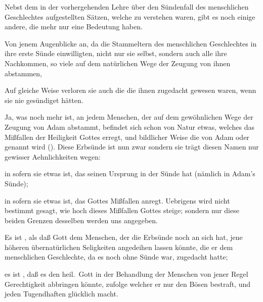 Nebst dem in der vorhergehenden Lehre über den Sündenfall des menschlichen Geschlechtes aufgestellten Sätzen, welche  zu verstehen waren, gibt es noch einige andere, die mehr nur eine  Bedeutung haben.
\begin{aufza}
\item Von jenem Augenblicke an, da die Stammeltern des menschlichen Geschlechtes in ihre erste Sünde einwilligten,  nicht nur sie selbst, sondern auch alle ihre Nachkommen, so viele auf dem natürlichen Wege der Zeugung von ihnen abstammen, 
\item Auf gleiche Weise verloren sie auch die  die ihnen zugedacht gewesen waren, wenn sie nie gesündiget hätten.
\item Ja, was noch mehr ist,  an jedem Menschen, der auf dem gewöhnlichen Wege der Zeugung von Adam abstammt, befindet sich schon von Natur etwas, welches das Mißfallen der Heiligkeit Gottes erregt, und bildlicher Weise die von Adam  oder  genannt wird (). Diese Erbsünde ist nun zwar  sondern sie trägt diesen Namen nur gewisser Aehnlichkeiten wegen:~
\begin{aufzb}
\item in sofern sie etwas ist, das seinen Ursprung in der Sünde hat (nämlich in Adam's Sünde);
\item in sofern sie etwas ist, das Gottes Mißfallen anregt. Uebrigens wird nicht bestimmt gesagt, wie hoch dieses Mißfallen Gottes steige; sondern nur diese beiden Grenzen desselben werden uns angegeben.
\begin{aufzc}
\item Es ist , als daß Gott dem Menschen, der die Erbsünde noch an sich hat, jene höheren übernatürlichen Seligkeiten angedeihen lassen könnte, die er dem menschlichen Geschlechte, da es noch ohne Sünde war, zugedacht hatte;
\item es ist , daß es den heil.\ Gott in der Behandlung der Menschen von jener Regel  Gerechtigkeit abbringen könnte, zufolge welcher er nur den Bösen bestraft, und jeden Tugendhaften glücklich macht.
\end{aufzc}
\end{aufzb}
\end{aufza}

